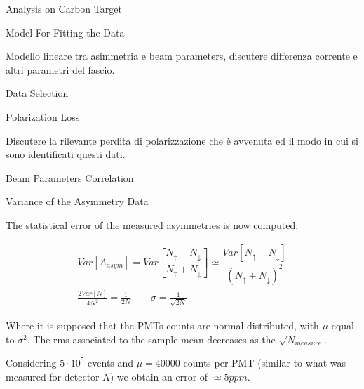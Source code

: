 \documentclass[9pt,a4paper]{beamer}
\begin{document}
\begin{frame}{Analysis on Carbon Target}

\end{frame}

\begin{frame}{Model For Fitting the Data}

Modello lineare tra asimmetria e beam parameters, discutere differenza corrente e altri parametri del fascio. 

\end{frame}

\begin{frame}{Data Selection}



\end{frame}

\begin{frame}{Polarization Loss}

Discutere la rilevante perdita di polarizzazione che è avvenuta ed il modo in cui si sono identificati questi dati.

\end{frame}

\begin{frame}{Beam Parameters Correlation}

\end{frame}

\begin{frame}{Variance of the Asymmetry Data}

The statistical error of the measured asymmetries is now computed:

\begin{gather*}
Var[A_{asym}] = Var[\dfrac{N_{\uparrow} - N_{\downarrow}}{ N_{\uparrow} + N_{\downarrow}}] \simeq \dfrac{Var[N_{\uparrow} - N_{\downarrow}]}{(N_{\uparrow} + N_{\downarrow})^{2}} \\
\frac{2Var[N]}{4N^{2}} = \frac{1}{2N} \qquad \sigma = \frac{1}{\sqrt{2N}}
\end{gather*}

Where it is supposed that the PMTs counts are normal distributed, with $\mu$ equal to $\sigma^{2}$. The rms associated to the sample mean decreases as the $\sqrt{N_{measure}}$. 

Considering $5\cdot 10^{5}$ events and $\mu = 40000$ counts per PMT (similar to what was measured for detector A) we obtain an error of $\simeq 5ppm$.

\end{frame}
\end{document}
